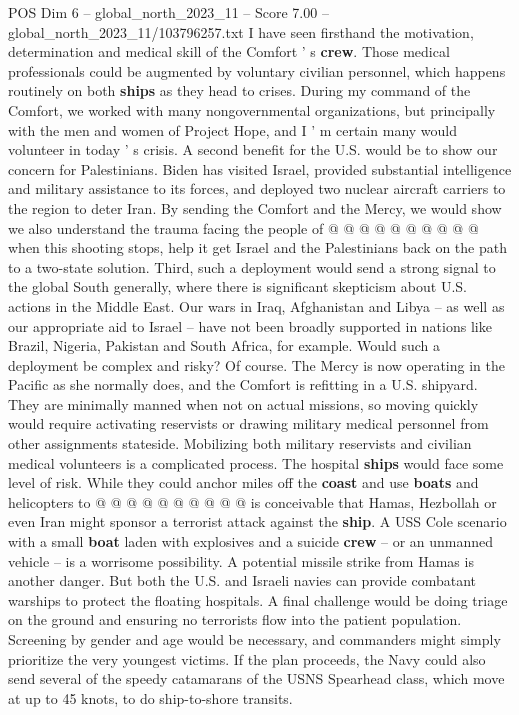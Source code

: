 \begin{textsample}{POS Dim 6 – global\_north\_2023\_11 – Score 7.00 – global\_north\_2023\_11/103796257.txt}
I have seen firsthand the motivation, determination and medical skill of the Comfort ' s \textbf{crew}.
Those medical professionals could be augmented by voluntary civilian personnel, which happens routinely on both \textbf{ships} as they head to crises.
During my command of the Comfort, we worked with many nongovernmental organizations, but principally with the men and women of Project Hope, and I ' m certain many would volunteer in today ' s crisis.
A second benefit for the U.S. would be to show our concern for Palestinians.
Biden has visited Israel, provided substantial intelligence and military assistance to its forces, and deployed two nuclear aircraft carriers to the region to deter Iran.
By sending the Comfort and the Mercy, we would show we also understand the trauma facing the people of @ @ @ @ @ @ @ @ @ @ when this shooting stops, help it get Israel and the Palestinians back on the path to a two-state solution.
Third, such a deployment would send a strong signal to the global South generally, where there is significant skepticism about U.S. actions in the Middle East.
Our wars in Iraq, Afghanistan and Libya -- as well as our appropriate aid to Israel -- have not been broadly supported in nations like Brazil, Nigeria, Pakistan and South Africa, for example.
Would such a deployment be complex and risky?
Of course.
The Mercy is now operating in the Pacific as she normally does, and the Comfort is refitting in a U.S. shipyard.
They are minimally manned when not on actual missions, so moving quickly would require activating reservists or drawing military medical personnel from other assignments stateside.
Mobilizing both military reservists and civilian medical volunteers is a complicated process.
The hospital \textbf{ships} would face some level of risk.
While they could anchor miles off the \textbf{coast} and use \textbf{boats} and helicopters to @ @ @ @ @ @ @ @ @ @ is conceivable that Hamas, Hezbollah or even Iran might sponsor a terrorist attack against the \textbf{ship}.
A USS Cole scenario with a small \textbf{boat} laden with explosives and a suicide \textbf{crew} -- or an unmanned vehicle -- is a worrisome possibility.
A potential missile strike from Hamas is another danger.
But both the U.S. and Israeli navies can provide combatant warships to protect the floating hospitals.
A final challenge would be doing triage on the ground and ensuring no terrorists flow into the patient population.
Screening by gender and age would be necessary, and commanders might simply prioritize the very youngest victims.
If the plan proceeds, the Navy could also send several of the speedy catamarans of the USNS Spearhead class, which move at up to 45 knots, to do ship-to-shore transits.

\end{textsample}
